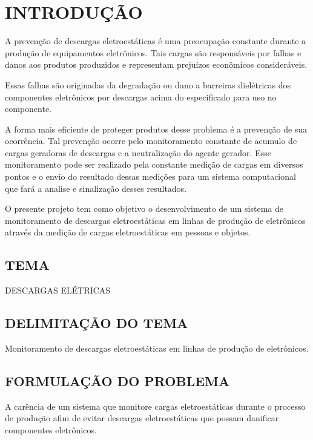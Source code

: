 \documentclass[
	12pt,				%
	openright,			%
	oneside,			%
	a4paper,			%
	chapter=TITLE,		%
	english,			%
	french,				%
	spanish,			%
	brazil,				%
	article,			%
	]{uea-abntex2}
\begin{document}
\chapter*{\vspace*{3.4cm}INTRODUÇÃO}
A prevenção de descargas eletroestáticas é uma preocupação constante durante a produção de equipamentos eletrônicos. Tais cargas são responsáveis por falhas e danos aos produtos produzidos e representam prejuízos econômicos consideráveis.

Essas falhas são originadas da degradação ou dano a barreiras dielétricas dos componentes eletrônicos por descargas acima do especificado para uso no componente.

A forma mais eficiente de proteger produtos desse problema é a prevenção de sua ocorrência. Tal prevenção ocorre pelo monitoramento constante de acumulo de cargas geradoras de descargas e a neutralização do agente gerador.
Esse monitoramento pode ser realizado pela constante medição de cargas em diversos pontos e o envio do resultado dessas medições para um sistema computacional que fará a analise e sinalização desses resultados. 

O presente projeto tem como objetivo o desenvolvimento de um sistema de monitoramento de descargas eletroestáticas em linhas de produção de eletrônicos através da medição de cargas eletroestáticas em pessoas e objetos.


\newpage

\vspace{24pt}
\section{TEMA}
DESCARGAS ELÉTRICAS
\section{DELIMITAÇÃO DO TEMA}
Monitoramento de descargas eletroestáticas em linhas de produção de eletrônicos.
\section{FORMULAÇÃO DO PROBLEMA}
A carência de um sistema que monitore cargas eletroestáticas durante o processo de produção afim de evitar descargas eletroestáticas que possam danificar componentes eletrônicos.  
\end{document}
